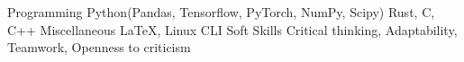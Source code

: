 

\begin{cvskills}

  \cvskill
    {Programming} %
    {Python(Pandas, Tensorflow, PyTorch, NumPy, Scipy)		Rust, C, C++} %
  \cvskill
    {Miscellaneous} %
    {\LaTeX , Linux CLI} %
  \cvskill
    {Soft Skills} %
    {Critical thinking, Adaptability, Teamwork, Openness to criticism} %

\end{cvskills}
